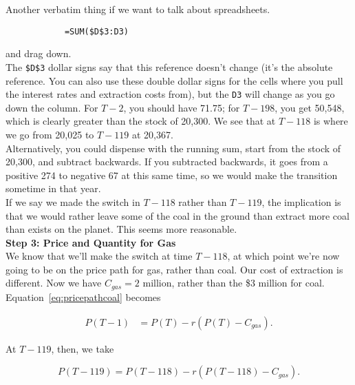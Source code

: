 \begin{enumerate}
\begin{Exercise}
\begin{sol}
        Another verbatim thing if we want to talk about spreadsheets.
        
        \begin{verbatim}
            =SUM($D$3:D3)
        \end{verbatim}
        and drag down.\\
        
        The \texttt{\$D\$3} dollar signs say that this reference doesn't change (it's the absolute reference. You can also use these double dollar signs for the cells where you pull the interest rates and extraction costs from), but the \texttt{D3} will change as you go down the column. For $T-2$, you should have 71.75; for $T-198$, you get 50,548, which is clearly greater than the stock of 20,300. We see that at $T-118$ is where we go from 20,025 to $T-119$ at 20,367.\\
        
        Alternatively, you could dispense with the running sum, start from the stock of 20,300, and subtract backwards. If you subtracted backwards, it goes from a positive 274 to negative 67 at this same time, so we would make the transition sometime in that year.\\
        
        If we say we made the switch in $T-118$ rather than $T-119$, the implication is that we would rather leave some of the coal in the ground than extract more coal than exists on the planet. This seems more reasonable. \\
        
        \textbf{Step 3: Price and Quantity for Gas}\\
        
        We know that we'll make the switch at time $T-118$, at which point we're now going to be on the price path for gas, rather than coal. Our cost of extraction is different. Now we have $C_{gas}=2$ million, rather than the \$3 million for coal. Equation~\eqref{eq:pricepathcoal} becomes
        
        \begin{equation}
            \begin{split}
            P(T-1) & = P(T)-r(P(T)-C_{gas}).
            \end{split}
            \label{eq:pricepathgas}
        \end{equation}       
        
        At $T-119$, then, we take
        
        \begin{equation*}
            P(T-119) = P(T-118)-r(P(T-118)-C_{gas}).
        \end{equation*}
        

\end{sol}
\end{Exercise}
\end{enumerate}
